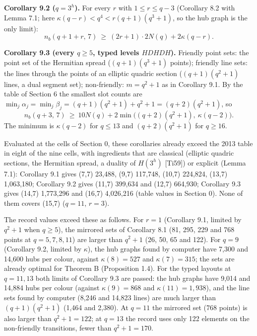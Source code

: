 \documentclass[
  11pt,
]{article}
\begin{document}
\textbf{Corollary 9.2 (\(q = 3^h\)).} For every \(r\) with \(1\le r\le q-3\) (Corollary 8.2 with Lemma 7.1; here
\(\kappa(q-r) < q^4 < r(q+1)(q^3+1)\), so the hub graph is the only limit):
\[n_b(q+1+r,\,7)\ \ge\ (2r+1)\cdot 2N(q) + 2\kappa(q-r).\]

\textbf{Corollary 9.3 (every \(q\ge 5\), typed levels \(HDHDH\)).} Friendly point sets: the point set of the Hermitian
spread (\((q+1)(q^3+1)\) points); friendly line sets: the lines through the points of an elliptic quadric section
(\((q+1)(q^2+1)\) lines, a dual segment set); non-friendly: \(m = q^2+1\) as in Corollary 9.1. By the table of Section 6
the smallest slot counts are \(\min_j\alpha_j = \min_j\beta_j = (q+1)(q^2+1) + q^2+1 = (q+2)(q^2+1)\), so
\[n_b(q+3,\,7)\ \ge\ 10N(q) + 2\min\bigl((q+2)(q^2+1),\ \kappa(q-2)\bigr).\] The minimum is \(\kappa(q-2)\) for
\(q\le 13\) and \((q+2)(q^2+1)\) for \(q\ge 16\).

Evaluated at the cells of Section 0, these corollaries already exceed the 2013 table in eight of the nine cells, with
ingredients that are classical (elliptic quadric sections, the Hermitian spread, a duality of \(H(3^h)\) {[}Ti59{]}) or
explicit (Lemma 7.1): Corollary 9.1 gives (7,7) 23,488, (9,7) 117,748, (10,7) 224,824, (13,7) 1,063,180; Corollary 9.2
gives (11,7) 399,634 and (12,7) 664,930; Corollary 9.3 gives (14,7) 1,773,296 and (16,7) 4,026,216 (table values in
Section 0). None of them covers (15,7) (\(q = 11\), \(r = 3\)).

The record values exceed these as follows. For \(r = 1\) (Corollary 9.1, limited by \(q^2+1\) when \(q\ge 5\)), the
mirrored sets of Corollary 8.1 (81, 295, 229 and 768 points at \(q = 5, 7, 8, 11\)) are larger than \(q^2+1\) (26, 50,
65 and 122). For \(q = 9\) (Corollary 9.2, limited by \(\kappa\)), the hub graphs found by computer have 7,300 and
14,600 hubs per colour, against \(\kappa(8) = 527\) and \(\kappa(7) = 315\); the sets are already optimal for Theorem B
(Proposition 1.4). For the typed layouts at \(q = 11, 13\) both limits of Corollary 9.3 are passed: the hub graphs have
9,014 and 14,884 hubs per colour (against \(\kappa(9) = 868\) and \(\kappa(11) = 1{,}938\)), and the line sets found by
computer (8,246 and 14,823 lines) are much larger than \((q+1)(q^2+1)\) (1,464 and 2,380). At \(q = 11\) the mirrored
set (768 points) is also larger than \(q^2+1 = 122\); at \(q = 13\) the record uses only 122 elements on the
non-friendly transitions, fewer than \(q^2+1 = 170\).
\end{document}
